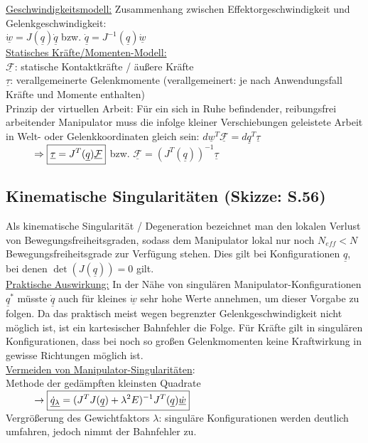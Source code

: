 \documentclass[a4paper,landscape,6pt]{article}
\newcommand{\ul}[1]{\underline{#1}}
\begin{document}
\begin{multicols}{3}
\ul{Geschwindigkeitsmodell:}
Zusammenhang zwischen Effektorgeschwindigkeit und Gelenkgeschwindigkeit:\\
\tab $\boxed{ \ul {\dot w} = J(\ul {q}) \ul {\dot q}}$ bzw. $\boxed{ \ul {\dot q} = J^{-1}(\ul {q}) \ul {\dot w}}$\\

\ul{Statisches Kräfte/Momenten-Modell:}\\
$\ul{\mathcal{F}}$: statische Kontaktkräfte / äußere Kräfte\\
$\ul \tau$: verallgemeinerte Gelenkmomente (verallgemeinert: je nach Anwendungsfall Kräfte und Momente enthalten)\\
Prinzip der virtuellen Arbeit: Für ein sich in Ruhe befindender, reibungsfrei arbeitender Manipulator muss die infolge kleiner Verschiebungen geleistete Arbeit in Welt- oder Gelenkkoordinaten gleich sein: $d\ul w ^T \ul{\mathcal{F}} = d \ul q^T \ul \tau$\\
$\tab \Rightarrow \boxed{\ul \tau = J^T(\ul q) \ul{\mathcal{F}}}$ bzw. $\boxed{\ul{\mathcal{F}} = (J^T(\ul q))^{-1} \ul \tau}$
\subsection*{Kinematische Singularitäten \footnotesize{(Skizze: S.56)}}
Als kinematische Singularität / Degeneration bezeichnet man den lokalen Verlust von Bewegungsfreiheitsgraden, sodass dem Manipulator lokal nur noch $N_{eff} < N$ Bewegungsfreiheitsgrade zur Verfügung stehen. Dies gilt bei Konfigurationen $\ul q$, bei denen $\det(J(\ul q)) = 0$ gilt.\\

\ul{Praktische Auswirkung:} In der Nähe von singulären Manipulator-Konfigurationen $\ul q^*$ müsste $\ul{\dot q}$ auch für kleines $\ul{\dot w}$ sehr hohe Werte annehmen, um dieser Vorgabe zu folgen. Da das praktisch meist wegen begrenzter Gelenkgeschwindigkeit nicht möglich ist, ist ein kartesischer Bahnfehler die Folge. Für Kräfte gilt in singulären Konfigurationen, dass bei noch so großen Gelenkmomenten keine Kraftwirkung in gewisse Richtungen möglich ist.\\
\ul{Vermeiden von Manipulator-Singularitäten}:\\

Methode der gedämpften kleinsten Quadrate\\ $\tab \rightarrow \boxed{\ul{\dot q_\lambda} = (J^T J(\ul q) + \lambda^2 E)^{-1}J^T(\ul q)\ul{\dot w}}$\\
Vergrößerung des Gewichtfaktors $\lambda$: singuläre Konfigurationen werden deutlich umfahren, jedoch nimmt der Bahnfehler zu.

\end{multicols}
\end{document}
